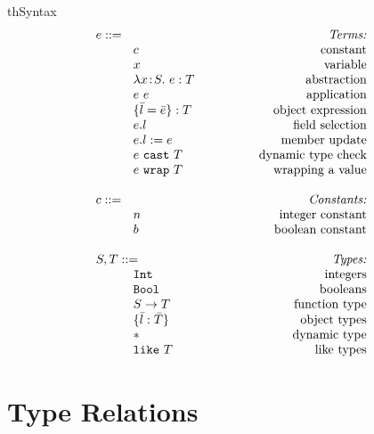 \documentclass{article}
\newcommand{\mkrefl}[3]{\t{ref}^{#3}~{#1}~#2}
\newcommand{\derefl}[2]{!^{#2}{#1}}
\newcommand{\assignl}[3]{{#1}:=^{#3}{#2}}
\newcommand{\Ref}[1]{\t{Ref}~{#1}}
\newcommand{\lam}[4]{\lambda#1\!:\!#2.\,\,#4:#3}
\newcommand{\lamt}[2]{#1\rightarrow #2}
\newcommand{\app}[2]{#1~#2}
\newcommand{\Int}{\t{Int}}
\newcommand{\Bool}{\t{Bool}}
\newcommand{\dynamic}{\t{*}}
\newcommand{\true}{\t{true}}
\newcommand{\false}{\t{false}}
\newcommand{\lett}[4]{\t{letXXX}~{#1}:{#2}={#3}~\t{in}~{#4}}
\newcommand{\astype}[2]{#1~\t{cast}~#2}
\renewcommand{\t}[1]{{\tt #1}}
\newcommand{\objty}[1]{\{#1\}}
\newcommand{\obje}[2]{\{#1\}:{#2}}
\newcommand{\objget}[2]{#1.#2}
\newcommand{\objcall}[2]{#1.#2()}
\newcommand{\objset}[3]{#1.#2:=#3}
\newcommand{\wrapty}[1]{\t{XXXX wrap}~#1}
\newcommand{\likety}[1]{\t{like}~#1}
\newcommand{\wrap}[2]{#1~\t{wrap}~#2}
\begin{document}


\begin{displayfigure}{th}{\label{fig:syntax}Syntax}
\[
\begin{array}{llr}
	\mydefhead{e ::=\qquad\qquad\qquad\qquad\qquad}{Terms:} 
	\mydefcase{c								}{constant} 
	\mydefcase{x								}{variable} 
	\mydefcase{\lam{x}{S}{T}{e} 				}{abstraction} 
	\mydefcase{\app{e}{e} 					}{application} 
	\mydefcase{\obje{\bar{l}=\bar{e}}{T}		}{object expression}
	\mydefcase{\objget{e}{l}					}{field selection}
	\mydefcase{\objset{e}{l}{e}				}{member update}
	\mydefcase{\astype{e}{T}					}{dynamic type check}
	\mydefcase{\wrap{e}{T}					}{wrapping a value}
\\
	\mydefhead{c ::=}{Constants:} 
	\mydefcase{n								}{integer constant} 
	\mydefcase{b								}{boolean constant} 
\\
	\mydefhead{S,T::=}{Types:} 
	\mydefcase{\Int 							}{integers}
	\mydefcase{\Bool							}{booleans}
	\mydefcase{\lamt{S}{T} 					}{function type}
	\mydefcase{\objty{\bar{l}:\bar{T}}	   	}{object types}
	\mydefcase{\dynamic 		    				}{dynamic type}
	\mydefcase{\likety{T}					}{like types}
	
\end{array}
\]
\end{displayfigure}


\clearpage
\section{Type Relations}
\end{document}
